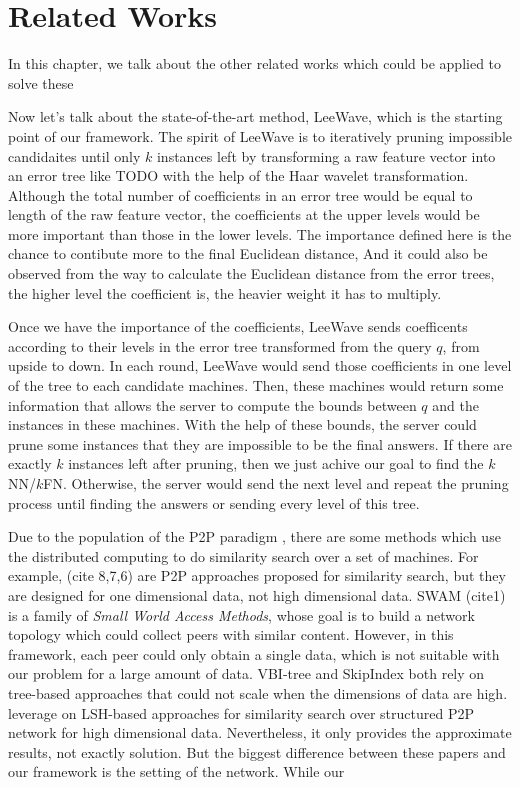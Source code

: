\chapter{Related Works}
\label{c:related}

In this chapter, we talk about the other related works which could be applied to solve these 


Now let's talk about the state-of-the-art method, LeeWave, which is the starting point of our framework. The spirit of LeeWave is to iteratively pruning impossible candidaites until only $k$ instances left by transforming a raw feature vector into an error tree like TODO with the help of the Haar wavelet transformation. Although the total number of coefficients in an error tree would be equal to length of the raw feature vector, the coefficients at the upper levels would be more important than those in the lower levels.  The importance defined here is the chance to contibute more to the final Euclidean distance,  And it could also be observed from the way to calculate the Euclidean distance from the error trees, the higher level the coefficient is, the heavier weight it has to multiply.

Once we have the importance of the coefficients, LeeWave sends coefficents according to their levels in the error tree transformed from the query $q$, from upside to down. In each round, LeeWave would send those coefficients in one level of the tree to each candidate machines.  Then, these machines would return some information that allows the server to compute the bounds between $q$ and the instances in these machines.  With the help of these bounds, the server could prune some instances that they are impossible to be the final answers.  If there are exactly $k$ instances left after pruning, then we just achive our goal to find the $k$NN/$k$FN.  Otherwise, the server would send the next level and repeat the pruning process until finding the answers or sending every level of this tree.

Due to the population of the P2P paradigm \cite{SCAN, Chord}, there are some methods which use the distributed computing to do similarity search over a set of machines.  For example, (cite 8,7,6) are P2P approaches proposed for similarity search, but they are designed for one dimensional data, not high dimensional data.  SWAM (cite1) is a family of \emph{Small World Access Methods}, whose goal is to build a network topology which could collect peers with similar content.  However, in this framework, each peer could only obtain a single data, which is not suitable with our problem for a large amount of data.  VBI-tree and SkipIndex both rely on tree-based approaches that could not scale when the dimensions of data are high. \cite{LSH} leverage on LSH-based approaches for similarity search over structured P2P network for high dimensional data.  Nevertheless, it only provides the approximate results, not exactly solution.  But the biggest difference between these papers and our framework is the setting of the network.  While our 



%
%